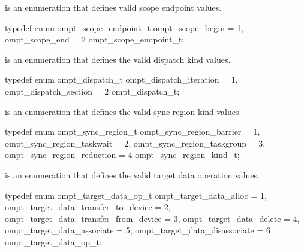 
\label{sec:ompt_scope_endpoint_t}
 is an enumeration that defines valid scope endpoint values.


\begin{ccppspecific}
\begin{omptEnum}
typedef enum ompt_scope_endpoint_t {
  ompt_scope_begin                    = 1,
  ompt_scope_end                      = 2
} ompt_scope_endpoint_t;
\end{omptEnum}
\end{ccppspecific}




\label{sec:ompt_dispatch_t}
 is an enumeration that defines the valid dispatch kind values.


\begin{ccppspecific}
\begin{omptEnum}
typedef enum ompt_dispatch_t {
  ompt_dispatch_iteration             = 1,
  ompt_dispatch_section               = 2
} ompt_dispatch_t;
\end{omptEnum}
\end{ccppspecific}




\label{sec:ompt_sync_region_t}
 is an enumeration that defines the valid sync region kind values.


\begin{ccppspecific}
\begin{omptEnum}
typedef enum ompt_sync_region_t {
  ompt_sync_region_barrier            = 1,
  ompt_sync_region_taskwait           = 2,
  ompt_sync_region_taskgroup          = 3,
  ompt_sync_region_reduction          = 4
} ompt_sync_region_kind_t;
\end{omptEnum}
\end{ccppspecific}





\label{sec:ompt_target_data_op_t}
 is an enumeration that defines the valid target data operation values.


\begin{ccppspecific}
\begin{omptEnum}
typedef enum ompt_target_data_op_t {
  ompt_target_data_alloc                = 1,
  ompt_target_data_transfer_to_device   = 2,
  ompt_target_data_transfer_from_device = 3,
  ompt_target_data_delete               = 4,
  ompt_target_data_associate            = 5,
  ompt_target_data_disassociate         = 6
} ompt_target_data_op_t;
\end{omptEnum}
\end{ccppspecific}




